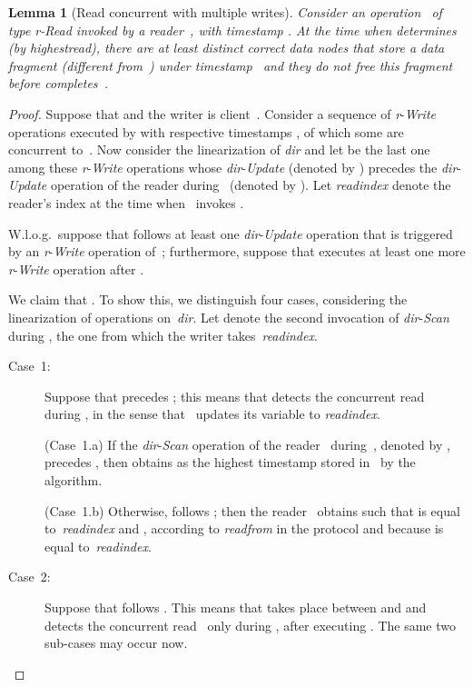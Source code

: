 \documentclass[oribibl]{llncs}
\newtheorem{lemma}[theorem]{Lemma}
\theoremstyle{definition-boldhead}
\newcommand{\var}[1]{\textit{#1}}
\newcommand{\op}[1]{\textsl{#1}}
\newcommand{\dir}{\var{dir}\xspace}
\newcommand{\nodes}{nodes\xspace}
\begin{document}
\begin{lemma}[Read concurrent with multiple writes]\label{lem:concurrent}
  Consider an operation~ of type \var{r}-\op{Read} invoked by a
  reader~, with timestamp .  At the time when 
  determines~ (by \op{highestread}), there are at least
   distinct correct data \nodes that store a data fragment
  (different from~) under timestamp~ and they do not
  free this fragment before  completes~.
\end{lemma}

\begin{proof}
  Suppose that  and the writer is
  client~.  Consider a sequence  of
  \var{r}-\op{Write} operations executed by  with respective
  timestamps , of which some
  are concurrent to~.  Now consider the linearization of \dir and
  let  be the last one among these \var{r}-\op{Write}
  operations whose \dir-\op{Update} (denoted by ) precedes
  the \dir-\op{Update} operation of the reader during~ (denoted
  by \updaterd).  Let \var{readindex} denote the reader's index
at the time when~ invokes \updaterd.

  W.l.o.g.\ suppose that \updaterd follows at least one
  \dir-\op{Update} operation that is triggered by an
  \var{r}-\op{Write} operation of~; furthermore, suppose that 
  executes at least one more \var{r}-\op{Write} operation
   after .

  We claim that .  To show this, we distinguish four cases,
  considering the linearization of operations on~\dir.  Let 
  denote the second invocation of \dir-\op{Scan} during , the
  one from which the writer takes~\var{readindex}.\begin{description}
  \item[Case~1:] Suppose that \updaterd precedes ; this
    means that  detects the concurrent read~ during ,
    in the sense that~ updates its variable  to
    \var{readindex}.

    (Case~1.a) If the \dir-\op{Scan} operation of the reader~
    during~, denoted by \scanrd, precedes , then
     obtains  as the highest timestamp
    stored in~ by the algorithm.

    (Case~1.b) Otherwise, \scanrd follows ; then the
    reader~ obtains  such that  is equal
    to~\var{readindex} and , according to
    \op{readfrom} in the protocol and because 
    is equal to~\var{readindex}.


  \item[Case~2:] Suppose that \updaterd follows .  This
    means that \updaterd{} takes place between  and
     and  detects the concurrent read~ only
    during , after executing .  The same two
    sub-cases may occur now.


\end{description}
\end{proof}
\end{document}
